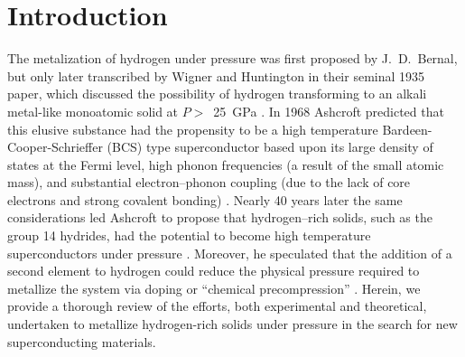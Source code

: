 \documentclass[12pt,letterpaper,oneside]{article}
\begin{document}


\section{Introduction}
%
The metalization of hydrogen under pressure was first proposed by J.\ D.\ Bernal, but only later transcribed by Wigner and Huntington in their seminal 1935 paper, which discussed the possibility of hydrogen transforming to an alkali metal-like monoatomic solid at $P>$~25~GPa \cite{Wigner:1935}. In 1968 Ashcroft predicted that this elusive substance had the propensity to be a high temperature Bardeen-Cooper-Schrieffer (BCS) type superconductor based upon its large density of states at the Fermi level, high phonon frequencies (a result of the small atomic mass), and substantial electron--phonon coupling (due to the lack of core electrons and strong covalent bonding) \cite{Ashcroft:1968a}. 
Nearly 40 years later the same considerations led Ashcroft to propose that hydrogen--rich solids, such as the group 14 hydrides, had the potential to become high temperature superconductors under pressure \cite{Ashcroft:2004a, Ashcroft:2004b}. Moreover, he speculated that the addition of a second element to hydrogen could reduce the physical pressure required to metallize the system via doping \cite{Carlsson:1983} or ``chemical precompression'' \cite{Ashcroft:2004a, Ashcroft:2004b}. Herein, we provide a thorough review of the efforts, both experimental and theoretical, undertaken to metallize hydrogen-rich solids under pressure in the search for new superconducting materials. 
\end{document}
